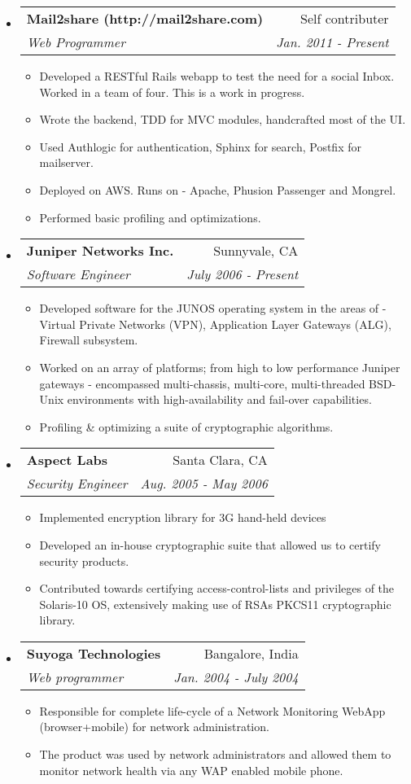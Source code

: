 \documentclass[letterpaper,11pt]{article}
\makeatletter
\newcommand{\resitem}[1]{\item #1 \vspace{-2pt}}
\newcommand{\resheading}[1]{{\large \parashade[.9]{sharpcorners}{\textbf{#1 \vphantom{p\^{E}}}}}}
\newcommand{\ressubheading}[4]{
\begin{tabular*}{6.5in}{l@{\extracolsep{\fill}}r}
		\textbf{#1} & #2 \\
		\textit{#3} & \textit{#4} \\
\end{tabular*}\vspace{-6pt}}
\makeatother
\begin{document}
\resheading{Work Experience}
\begin{itemize}

\item
	\ressubheading{Mail2share (http://mail2share.com)}{Self contributer}{Web Programmer}{Jan. 2011 - Present}
	\begin{itemize}
		\resitem{Developed a RESTful Rails webapp to test the need for a social Inbox. Worked in a team of four. This is a work in progress.}
		\resitem{Wrote the backend, TDD for MVC modules, handcrafted most of the UI.}
		\resitem{Used Authlogic for authentication, Sphinx for search, Postfix for mailserver.}
		\resitem{Deployed on AWS. Runs on - Apache, Phusion Passenger and Mongrel.}
		\resitem{Performed basic profiling and optimizations.}
	\end{itemize}
		
\item
	\ressubheading{Juniper Networks Inc.}{Sunnyvale, CA}{Software Engineer}{July 2006 - Present}
	\begin{itemize}
		\resitem{Developed software for the JUNOS operating system in the areas of - Virtual Private Networks (VPN), Application Layer Gateways (ALG), Firewall subsystem.}
		\resitem{Worked on an array of platforms; from high to low performance Juniper gateways - encompassed multi-chassis, multi-core, multi-threaded BSD-Unix environments with high-availability and fail-over capabilities.}
		\resitem{Profiling \& optimizing a suite of cryptographic algorithms.}
	\end{itemize}

\item 
	\ressubheading{Aspect Labs}{Santa Clara, CA}{Security Engineer}{Aug. 2005 - May 2006}
	\begin{itemize}
		\resitem{Implemented encryption library for 3G hand-held devices}
		\resitem{Developed an in-house cryptographic suite that allowed us to certify security products.}
		\resitem{Contributed towards certifying access-control-lists and privileges of the Solaris-10 OS, extensively making use of RSAs PKCS11 cryptographic library.}
	\end{itemize}

\item
	\ressubheading{Suyoga Technologies}{Bangalore, India}{Web programmer}{Jan. 2004 - July 2004}
	\begin{itemize}
		\resitem{Responsible for complete life-cycle of a Network Monitoring WebApp (browser+mobile) for network administration.}
		\resitem{The product was used by network administrators and allowed them to monitor network health via any WAP enabled mobile phone.} 
	\end{itemize}
	
\end{itemize}
\end{document}

